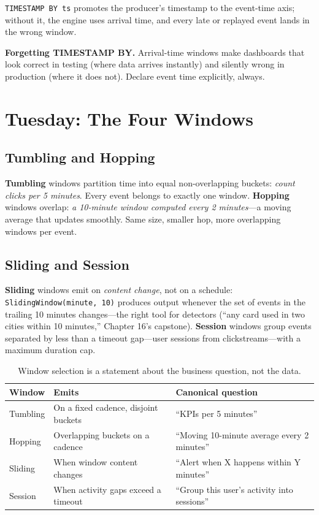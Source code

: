 \texttt{TIMESTAMP BY ts} promotes the producer's timestamp to the event-time axis; without it, the engine uses arrival time, and every late or replayed event lands in the wrong window.

\begin{pitfall}
\textbf{Forgetting TIMESTAMP BY.} Arrival-time windows make dashboards that look correct in testing (where data arrives instantly) and silently wrong in production (where it does not). Declare event time explicitly, always.
\end{pitfall}

\section{Tuesday: The Four Windows}

\subsection{Tumbling and Hopping}
\textbf{Tumbling} windows partition time into equal non-overlapping buckets: \emph{count clicks per 5 minutes}. Every event belongs to exactly one window. \textbf{Hopping} windows overlap: \emph{a 10-minute window computed every 2 minutes}---a moving average that updates smoothly. Same size, smaller hop, more overlapping windows per event.

\subsection{Sliding and Session}
\textbf{Sliding} windows emit on \emph{content change}, not on a schedule: \texttt{SlidingWindow(minute, 10)} produces output whenever the set of events in the trailing 10 minutes changes---the right tool for detectors (``any card used in two cities within 10 minutes,'' Chapter 16's capstone). \textbf{Session} windows group events separated by less than a timeout gap---user sessions from clickstreams---with a maximum duration cap.

\begin{table}[H]
\centering
\small
\begin{tabular}{@{}p{2.6cm}p{4.4cm}p{6.2cm}@{}}
\toprule
\textbf{Window} & \textbf{Emits} & \textbf{Canonical question} \\
\midrule
Tumbling & On a fixed cadence, disjoint buckets & ``KPIs per 5 minutes'' \\
Hopping & Overlapping buckets on a cadence & ``Moving 10-minute average every 2 minutes'' \\
Sliding & When window content changes & ``Alert when X happens within Y minutes'' \\
Session & When activity gaps exceed a timeout & ``Group this user's activity into sessions'' \\
\bottomrule
\end{tabular}
\caption{Window selection is a statement about the business question, not the data.}
\label{tab:ch14-windows}
\end{table}

